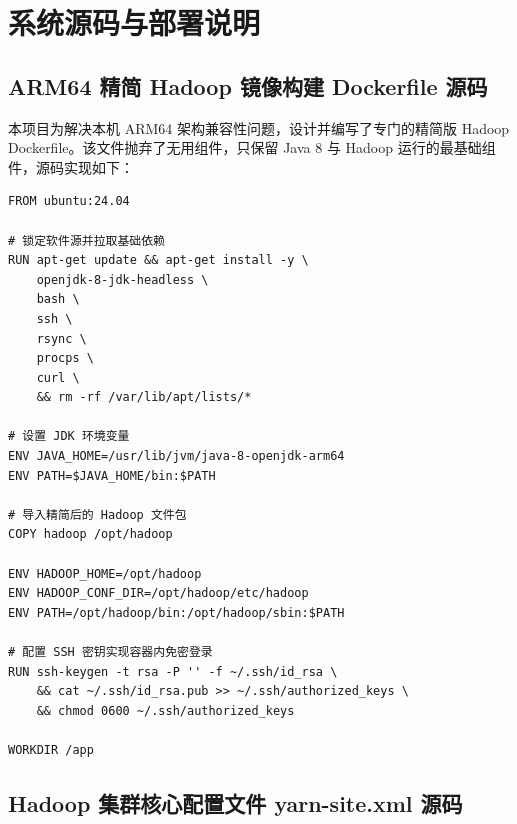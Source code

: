 
\chapter{系统源码与部署说明}

\section{ARM64 精简 Hadoop 镜像构建 Dockerfile 源码}

本项目为解决本机 ARM64 架构兼容性问题，设计并编写了专门的精简版 Hadoop Dockerfile。该文件抛弃了无用组件，只保留 Java 8 与 Hadoop 运行的最基础组件，源码实现如下：
\begin{lstlisting}[style=codexcode]
FROM ubuntu:24.04

# 锁定软件源并拉取基础依赖
RUN apt-get update && apt-get install -y \
    openjdk-8-jdk-headless \
    bash \
    ssh \
    rsync \
    procps \
    curl \
    && rm -rf /var/lib/apt/lists/*

# 设置 JDK 环境变量
ENV JAVA_HOME=/usr/lib/jvm/java-8-openjdk-arm64
ENV PATH=$JAVA_HOME/bin:$PATH

# 导入精简后的 Hadoop 文件包
COPY hadoop /opt/hadoop

ENV HADOOP_HOME=/opt/hadoop
ENV HADOOP_CONF_DIR=/opt/hadoop/etc/hadoop
ENV PATH=/opt/hadoop/bin:/opt/hadoop/sbin:$PATH

# 配置 SSH 密钥实现容器内免密登录
RUN ssh-keygen -t rsa -P '' -f ~/.ssh/id_rsa \
    && cat ~/.ssh/id_rsa.pub >> ~/.ssh/authorized_keys \
    && chmod 0600 ~/.ssh/authorized_keys

WORKDIR /app
\end{lstlisting}

\section{Hadoop 集群核心配置文件 yarn-site.xml 源码}

